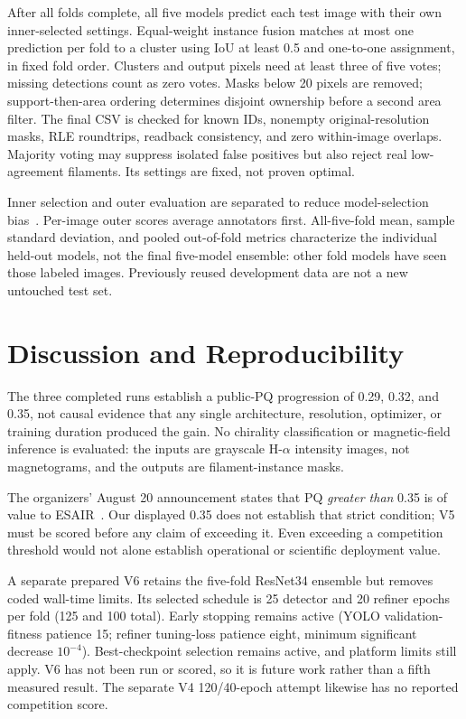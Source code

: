 \documentclass[sigconf]{acmart}
\begin{document}
After all folds complete, all five models predict each test image with
their own inner-selected settings. Equal-weight instance fusion matches
at most one prediction per fold to a cluster using IoU at least 0.5 and
one-to-one assignment, in fixed fold order. Clusters and output pixels
need at least three of five votes; missing detections count as zero votes.
Masks below 20 pixels are removed; support-then-area ordering determines
disjoint ownership before a second area filter. The final CSV is checked
for known IDs, nonempty original-resolution masks, RLE roundtrips,
readback consistency, and zero within-image overlaps.
Majority voting may suppress isolated false positives but also reject
real low-agreement filaments. Its settings are fixed, not proven optimal.

Inner selection and outer evaluation are separated to reduce model-selection
bias~\cite{varma2006}. Per-image outer scores average annotators first.
All-five-fold mean, sample standard deviation, and pooled out-of-fold
metrics characterize the individual held-out models, not the final
five-model ensemble: other fold models have seen those labeled images.
Previously reused development data are not a new untouched test set.

\section{Discussion and Reproducibility}
The three completed runs establish a public-PQ progression of
0.29, 0.32, and 0.35, not causal evidence that any single architecture,
resolution, optimizer, or training duration produced the gain. No
chirality classification or magnetic-field inference is evaluated:
the inputs are grayscale H-$\alpha$ intensity images, not magnetograms,
and the outputs are filament-instance masks.

The organizers' August 20 announcement states that PQ \emph{greater than}
0.35 is of value to ESAIR~\cite{filamentannouncements}. Our displayed 0.35
does not establish that strict condition; V5 must be scored before any
claim of exceeding it.
Even exceeding a competition threshold would not alone establish
operational or scientific deployment value.

A separate prepared V6 retains the five-fold ResNet34 ensemble but
removes coded wall-time limits. Its selected schedule
is 25 detector and 20 refiner epochs per fold (125 and 100 total).
Early stopping remains active (YOLO validation-fitness patience 15;
refiner tuning-loss patience eight, minimum significant decrease $10^{-4}$).
Best-checkpoint selection remains active, and platform limits still
apply. V6 has not been run or scored, so it is future work rather than
a fifth measured result. The separate V4 120/40-epoch attempt likewise
has no reported competition score.
\end{document}

